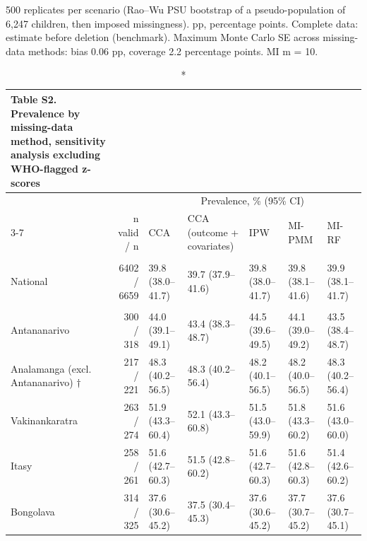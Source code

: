 \documentclass[11pt,a4paper]{article}
\begin{document}
\begin{minipage}{\linewidth}
\vspace{.05em}
500 replicates per scenario (Rao–Wu PSU bootstrap of a pseudo-population of 6,247 children, then imposed missingness). pp, percentage points. Complete data: estimate before deletion (benchmark). Maximum Monte Carlo SE across missing-data methods: bias 0.06 pp, coverage 2.2 percentage points. MI m = 10.\\
\end{minipage}
\endgroup

\clearpage

\begin{landscape}
\begingroup
\fontsize{8.0pt}{10.0pt}\selectfont
\setlength{\LTpost}{0mm}
\begin{longtable}{l|rlllll}
\caption*{
{\fontsize{20}{25}\selectfont  Table S2. Prevalence by missing-data method, sensitivity analysis excluding WHO-flagged z-scores\fontsize{8}{10}\selectfont }
} \\ 
\toprule
 &  & \multicolumn{5}{c}{{Prevalence, \% (95\% CI)}} \\ 
\cmidrule(lr){3-7}
 & n valid / n & CCA & CCA (outcome + covariates) & IPW & MI-PMM & MI-RF \\ 
\midrule\endhead\addlinespace[2.5pt]
\multicolumn{7}{l}{Stunting — National} \\[2.5pt] 
\midrule\addlinespace[2.5pt]
National & 6402 / 6659 & 39.8 (38.0–41.7) & 39.7 (37.9–41.6) & 39.8 (38.0–41.7) & 39.8 (38.1–41.6) & 39.9 (38.1–41.7) \\ 
\midrule\addlinespace[2.5pt]
\multicolumn{7}{l}{Stunting — Region} \\[2.5pt] 
\midrule\addlinespace[2.5pt]
Antananarivo & 300 / 318 & 44.0 (39.1–49.1) & 43.4 (38.3–48.7) & 44.5 (39.6–49.5) & 44.1 (39.0–49.2) & 43.5 (38.4–48.7) \\ 
Analamanga (excl. Antananarivo) $\dagger$ & 217 / 221 & 48.3 (40.2–56.5) & 48.3 (40.2–56.4) & 48.2 (40.1–56.5) & 48.2 (40.0–56.5) & 48.3 (40.2–56.4) \\ 
Vakinankaratra & 263 / 274 & 51.9 (43.3–60.4) & 52.1 (43.3–60.8) & 51.5 (43.0–59.9) & 51.8 (43.3–60.2) & 51.6 (43.0–60.0) \\ 
Itasy & 258 / 261 & 51.6 (42.7–60.3) & 51.5 (42.8–60.2) & 51.6 (42.7–60.3) & 51.6 (42.8–60.3) & 51.4 (42.6–60.2) \\ 
Bongolava & 314 / 325 & 37.6 (30.6–45.2) & 37.5 (30.4–45.3) & 37.6 (30.6–45.2) & 37.7 (30.7–45.2) & 37.6 (30.7–45.1) \\ 

\end{longtable}
\end{landscape}
\end{document}
